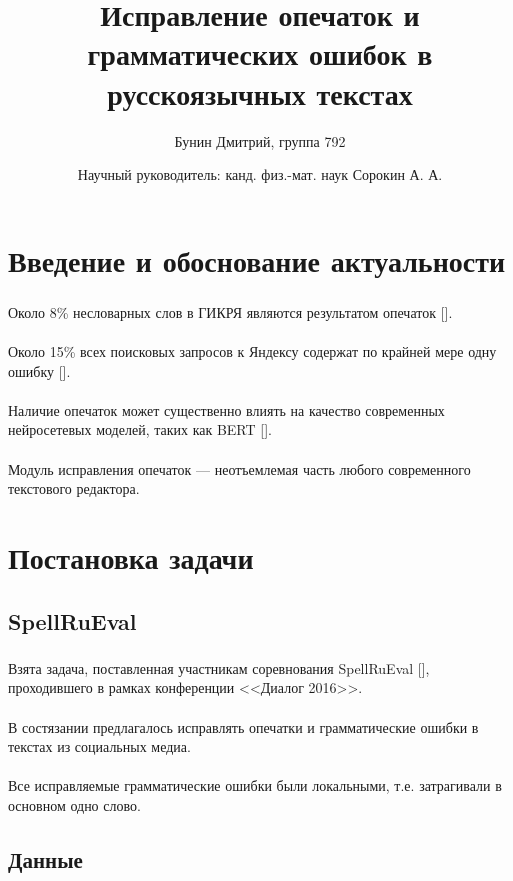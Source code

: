 \documentclass[t, aspectratio=169]{beamer}  %
\title{Исправление опечаток и грамматических ошибок в русскоязычных текстах}
\author{Бунин Дмитрий, группа 792}
\date{Научный руководитель: канд. физ.-мат. наук Сорокин А. А.}
\begin{document}
\frame[plain]{\titlepage}

\section{Введение и обоснование актуальности}
\begin{frame}
	\frametitle{\insertsection}
	Около 8\%  несловарных слов в ГИКРЯ являются результатом опечаток [\textcite{Shavrina2015}]. \\~\\
	Около 15\% всех поисковых запросов к Яндексу содержат по крайней мере одну ошибку [\textcite{Bajtin2008}]. \\~\\
	Наличие опечаток может существенно влиять на качество современных нейросетевых моделей, таких как BERT [\textcite{Kumar2020}]. \\~\\
	Модуль исправления опечаток --- неотъемлемая часть любого современного текстового редактора.
\end{frame}

\section{Постановка задачи}

\subsection{SpellRuEval}
\begin{frame}
	\frametitle{\insertsection}
	\framesubtitle{\insertsubsection}
	
	Взята задача, поставленная участникам соревнования SpellRuEval [\textcite{Sorokin2016a}], проходившего в рамках конференции <<Диалог 2016>>. \\~\\
	
	В состязании предлагалось исправлять опечатки и грамматические ошибки в текстах из социальных медиа. \\~\\
	
	Все исправляемые грамматические ошибки были локальными, т.е. затрагивали в основном одно слово.
\end{frame}

\subsection{Данные}
\end{document}
